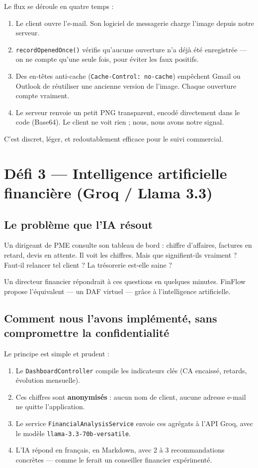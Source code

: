 \documentclass[12pt,a4paper]{report}
\begin{document}
Le flux se déroule en quatre temps :
\begin{enumerate}[leftmargin=*]
    \item Le client ouvre l'e-mail. Son logiciel de messagerie charge l'image depuis notre serveur.
    \item \texttt{recordOpenedOnce()} vérifie qu'aucune ouverture n'a déjà été enregistrée --- on ne compte qu'une seule fois, pour éviter les faux positifs.
    \item Des en-têtes anti-cache (\texttt{Cache-Control: no-cache}) empêchent Gmail ou Outlook de réutiliser une ancienne version de l'image. Chaque ouverture compte vraiment.
    \item Le serveur renvoie un petit PNG transparent, encodé directement dans le code (Base64). Le client ne voit rien ; nous, nous avons notre signal.
\end{enumerate}

C'est discret, léger, et redoutablement efficace pour le suivi commercial.

\section{Défi 3 — Intelligence artificielle financière (Groq / Llama 3.3)}

\subsection{Le problème que l'IA résout}

Un dirigeant de PME consulte son tableau de bord : chiffre d'affaires, factures en retard, devis en attente. Il voit les chiffres. Mais que signifient-ils vraiment ? Faut-il relancer tel client ? La trésorerie est-elle saine ?

Un directeur financier répondrait à ces questions en quelques minutes. FinFlow propose l'équivalent --- un DAF virtuel --- grâce à l'intelligence artificielle.

\subsection{Comment nous l'avons implémenté, sans compromettre la confidentialité}

Le principe est simple et prudent :

\begin{enumerate}[leftmargin=*]
    \item Le \texttt{DashboardController} compile les indicateurs clés (CA encaissé, retards, évolution mensuelle).
    \item Ces chiffres sont \textbf{anonymisés} : aucun nom de client, aucune adresse e-mail ne quitte l'application.
    \item Le service \texttt{FinancialAnalysisService} envoie ces agrégats à l'API Groq, avec le modèle \texttt{llama-3.3-70b-versatile}.
    \item L'IA répond en français, en Markdown, avec 2 à 3 recommandations concrètes --- comme le ferait un conseiller financier expérimenté.
\end{enumerate}
\end{document}
